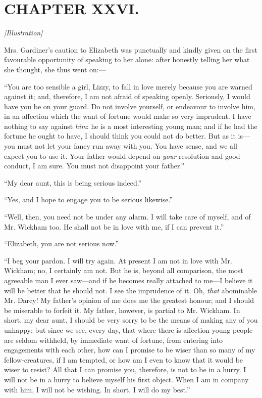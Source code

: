 \documentclass[12pt]{book}
\begin{document}
\chapter{CHAPTER XXVI.}

\emph{[Illustration]}

Mrs. Gardiner's caution to Elizabeth was punctually and kindly given on the first favourable opportunity of speaking to her alone: after honestly telling her what she thought, she thus went on:---

``You are too sensible a girl, Lizzy, to fall in love merely because you are warned against it; and, therefore, I am not afraid of speaking openly. Seriously, I would have you be on your guard. Do not involve yourself, or endeavour to involve him, in an affection which the want of fortune would make so very imprudent. I have nothing to say against \textit{him}: he is a most interesting young man; and if he had the fortune he ought to have, I should think you could not do better. But as it is---you must not let your fancy run away with you. You have sense, and we all expect you to use it. Your father would depend on \textit{your} resolution and good conduct, I am sure. You must not disappoint your father.''

``My dear aunt, this is being serious indeed.''

``Yes, and I hope to engage you to be serious likewise.''

``Well, then, you need not be under any alarm. I will take care of myself, and of Mr. Wickham too. He shall not be in love with me, if I can prevent it.''

``Elizabeth, you are not serious now.''

``I beg your pardon. I will try again. At present I am not in love with Mr. Wickham; no, I certainly am not. But he is, beyond all comparison, the most agreeable man I ever saw---and if he becomes really attached to me---I believe it will be better that he should not. I see the imprudence of it. Oh, \textit{that} abominable Mr. Darcy! My father's opinion of me does me the greatest honour; and I should be miserable to forfeit it. My father, however, is partial to Mr. Wickham. In short, my dear aunt, I should be very sorry to be the means of making any of you unhappy; but since we see, every day, that where there is affection young people are seldom withheld, by immediate want of fortune, from entering into engagements with each other, how can I promise to be wiser than so many of my fellow-creatures, if I am tempted, or how am I even to know that it would be wiser to resist? All that I can promise you, therefore, is not to be in a hurry. I will not be in a hurry to believe myself his first object. When I am in company with him, I will not be wishing. In short, I will do my best.''
\end{document}
